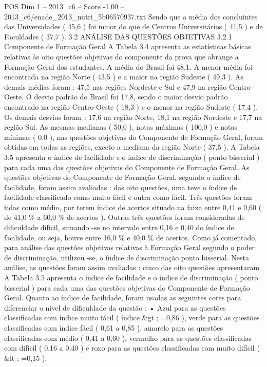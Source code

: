 \begin{textsample}{POS Dim 1 – 2013\_c6 – Score -1.00 – 2013\_c6/enade\_2013\_nutri\_5b06570937.txt}
Sendo que a média dos concluintes das Universidades ( 45,6 ) foi maior do que de Centros Universitários ( 41,5 ) e de Faculdades ( 37,7 ). 3.2 ANÁLISE DAS QUESTÕES OBJETIVAS 3.2.1 Componente de Formação Geral A Tabela 3.4 apresenta as estatísticas básicas relativas às oito questões objetivas do componente da prova que abrange a Formação Geral dos estudantes.
A média do Brasil foi 48,1.
A menor média foi encontrada na região Norte ( 43,5 ) e a maior na região Sudeste ( 49,3 ).
As demais médias foram : 47,5 nas regiões Nordeste e Sul e 47,9 na região Centro-Oeste.
O desvio padrão do Brasil foi 17,8, sendo o maior desvio padrão encontrado na região Centro-Oeste ( 18,3 ) e o menor na região Sudeste ( 17,4 ).
Os demais desvios foram : 17,6 na região Norte, 18,1 na região Nordeste e 17,7 na região Sul.
As mesmas medianas ( 50,0 ), notas máximas ( 100,0 ) e notas mínimas ( 0,0 ), nas questões objetivas do Componente de Formação Geral, foram obtidas em todas as regiões, exceto a mediana da região Norte ( 37,5 ).
A Tabela 3.5 apresenta o índice de facilidade e o índice de discriminação ( ponto bisserial ) para cada uma das questões objetivas do Componente de Formação Geral.
As questões objetivas do Componente de Formação Geral, segundo o índice de facilidade, foram assim avaliadas : das oito questões, uma teve o índice de facilidade classificado como muito fácil e outra como fácil.
Três questões foram tidas como médio, por terem índice de acertos situado na faixa entre 0,41 e 0,60 ( de 41,0 \% a 60,0 \% de acertos ).
Outras três questões foram consideradas de dificuldade difícil, situando -se no intervalo entre 0,16 e 0,40 do índice de facilidade, ou seja, houve entre 16,0 \% e 40,0 \% de acertos.
Como já comentado, para análise das questões objetivas relativas à Formação Geral segundo o poder de discriminação, utilizou -se, o índice de discriminação ponto bisserial.
Nesta análise, as questões foram assim avaliadas : cinco das oito questões apresentaram A Tabela 3.5 apresenta o índice de facilidade e o índice de discriminação ( ponto bisserial ) para cada uma das questões objetivas do Componente de Formação Geral.
Quanto ao índice de facilidade, foram usadas as seguintes cores para diferenciar o nível de dificuldade da questão : • Azul para as questões classificadas com índice muito fácil ( índice \&gt ; =0,86 ), verde para as questões classificadas com índice fácil ( 0,61 a 0,85 ), amarelo para as questões classificadas com médio ( 0,41 a 0,60 ), vermelho para as questões classificadas com difícil ( 0,16 a 0,40 ) e roxo para as questões classificadas com muito difícil ( \&lt ; =0,15 ).

\end{textsample}

